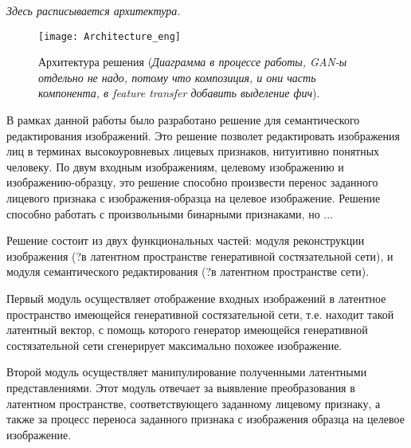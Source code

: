 \emph{Здесь расписывается архитектура.}

\begin{figure}[h]
\begin{center}
    \texttt{[image: Architecture\_eng]}
    \caption{Архитектура решения (\emph{Диаграмма в процессе работы, GAN-ы отдельно не надо, потому что композиция, и они часть компонента, в feature transfer добавить выделение фич}).}
    \label{fig:architecture}
\end{center}
\end{figure}

В рамках данной работы было разработано решение для семантического редактирования изображений. Это решение позволет редактировать изображения лиц в терминах высокоуровневых лицевых признаков, нитуитивно понятных человеку. %
По двум входным изображениям, целевому изображению и изображению-образцу, это решение способно произвести перенос заданного лицевого признака с изображения-образца на целевое изображение.
Решение способно работать с произвольными бинарными признаками, но ...

Решение состоит из двух функциональных частей: модуля реконструкции изображения (?в латентном пространстве генеративной состязательной сети), и модуля семантического редактирования (?в латентном пространстве сети).

Первый модуль осуществляет отображение входных изображений в латентное пространство имеющейся генеративной состязательной сети, т.е. находит такой латентный вектор, с помощь которого генератор имеющейся генеративной состязательной сети сгенерирует максимально похожее изображение.

Второй модуль осуществляет манипулирование полученными латентными представлениями. Этот модуль отвечает за выявление преобразования в латентном пространстве, соответствующего заданному лицевому признаку, а также за процесс переноса заданного признака с изображения образца на целевое изображение.


